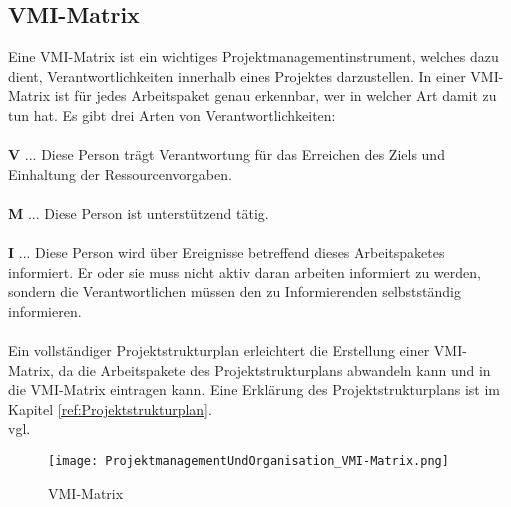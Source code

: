 \subsection{VMI-Matrix}
\label{sec:VMI-Matrix}
Eine VMI-Matrix ist ein wichtiges Projektmanagementinstrument, welches dazu dient, Verantwortlichkeiten innerhalb eines Projektes darzustellen. In einer VMI-Matrix ist für jedes Arbeitspaket genau erkennbar, wer in welcher Art damit zu tun hat. Es gibt drei Arten von Verantwortlichkeiten: \\ \\
\textbf{V} ... Diese Person trägt Verantwortung für das Erreichen des Ziels und Einhaltung der Ressourcenvorgaben.\\ \\
\textbf{M} ... Diese Person ist unterstützend tätig.\\ \\
\textbf{I} ... Diese Person wird über Ereignisse betreffend dieses Arbeitspaketes informiert. Er oder sie muss nicht aktiv daran arbeiten informiert zu werden, sondern die Verantwortlichen müssen den zu Informierenden selbstständig informieren.\\ \\
Ein vollständiger Projektstrukturplan erleichtert die Erstellung einer VMI-Matrix, da die Arbeitspakete des Projektstrukturplans abwandeln kann und in die VMI-Matrix eintragen kann. Eine Erklärung des Projektstrukturplans ist im Kapitel \ref{ref:Projektstrukturplan}.\\vgl. 
\textcite{VMI-Matrix}\\

\begin{figure}[H]
	\texttt{[image: ProjektmanagementUndOrganisation\_VMI-Matrix.png]}
    \caption{VMI-Matrix}
    \label{fig:vmi-Matrix}
\end{figure}


\pagebreak	
		
